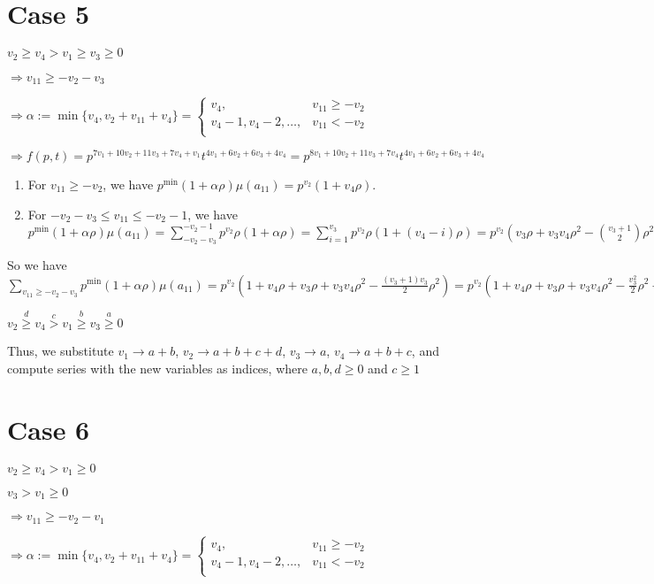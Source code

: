 \documentclass{article}
\begin{document}
\section{Case 5}
$v_2\geq{v_4}>v_1\geq{v_3}\geq{0}$

$\Rightarrow{v_{11}}\geq{-v_2-v_3}$

$\Rightarrow\alpha:=\min\{v_4,v_2+v_{11}+v_4\}=\begin{cases}
       v_4, & v_{11}\geq{-v_2}\\
       v_4-1,v_4-2,\dots, & v_{11}<{-v_2}\\
     \end{cases}$

     $\Rightarrow{f(p,t)=p^{7v_1+10v_2+11v_3+7v_4+v_1}t^{4v_1+6v_2+6v_3+4v_4}=p^{8v_1+10v_2+11v_3+7v_4}t^{4v_1+6v_2+6v_3+4v_4}}$
\begin{enumerate}
    \item 
For $v_{11}\geq{-v_2}$, we have $p^{\min}(1+\alpha\rho)\mu(a_{11})=p^{v_2}(1+v_4\rho).$
\item 
For $-v_2-v_3\leq{v_{11}}\leq{-v_2-1}$, we have $p^{\min}(1+\alpha\rho)\mu(a_{11})=\sum_{-v_2-v_3}^{-v_2-1}p^{v_2}\rho(1+\alpha\rho)=\sum_{i=1}^{v_3}p^{v_2}\rho(1+(v_4-i)\rho)=p^{v_2}(v_3\rho+v_3v_4\rho^2-\binom{v_3+1}{2}\rho^2).$
\end{enumerate}
So we have $\sum_{v_{11}\geq{-v_2-v_3}}p^{\min}(1+\alpha\rho)\mu(a_{11})=p^{v_2}(1+v_4\rho+v_3\rho+v_3v_4\rho^2-\frac{(v_3+1)v_3}{2}\rho^2)=p^{v_2}(1+v_4\rho+v_3\rho+v_3v_4\rho^2-\frac{v_3^2}{2}\rho^2-\frac{v_3}{2}\rho^2).$

$v_2\overset{d}{\geq}v_4\overset{c}{>}v_1\overset{b}{\geq}{v_3}\overset{a}{\geq}{0}$

Thus, we substitute 
$v_1\rightarrow{a+b}$, 
$v_2\rightarrow{a+b+c+d}$, 
$v_3\rightarrow{a}$, 
$v_4\rightarrow{a+b+c}$, and compute series with the new variables as indices, where $a,b,d\geq{0}$ and $c\geq{1}$

\section{Case 6}
$v_2\geq{v_4}>v_1\geq{0}$

$v_3>v_1\geq{0}$

$\Rightarrow{v_{11}}\geq{-v_2-v_1}$

$\Rightarrow\alpha:=\min\{v_4,v_2+v_{11}+v_4\}=\begin{cases}
       v_4, & v_{11}\geq{-v_2}\\
       v_4-1,v_4-2,\dots, & v_{11}<{-v_2}\\
     \end{cases}$
\end{document}

